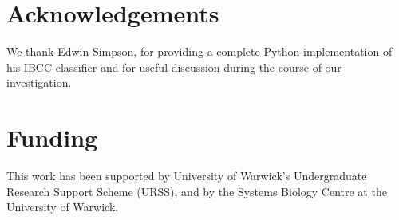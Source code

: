 \documentclass{bioinfo}
\begin{document}
\clearpage

\section*{Acknowledgements}

We thank Edwin Simpson, for providing a complete Python implementation of his IBCC classifier and for useful discussion during the course of our investigation.

\section*{Funding}

This work has been supported by University of Warwick's Undergraduate Research Support Scheme (URSS), and by the Systems Biology Centre at the University of Warwick.

%
%
%
%
%
%
%
%
%
\end{document}
